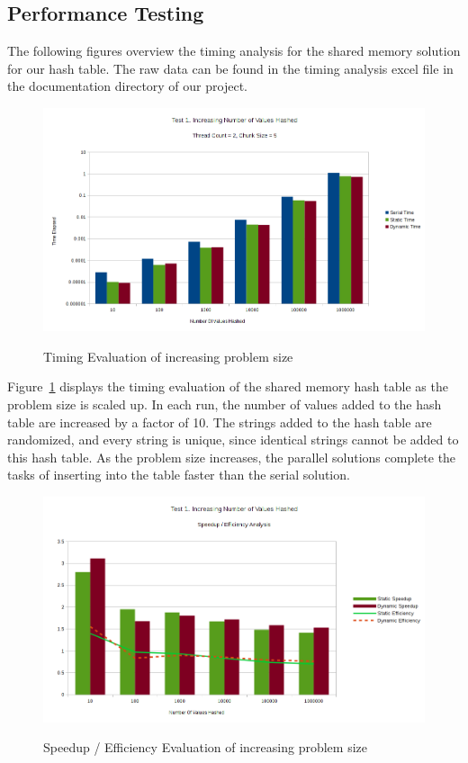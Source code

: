 \documentclass{article}
\begin{document}
\subsection{Performance Testing}
The following figures overview the timing analysis for the shared memory solution for our hash table.
The raw data can be found in the timing analysis excel file in the documentation directory of
our project.
\begin{figure}[H]
  \caption{Timing Evaluation of increasing problem size}
  \centering
  \includegraphics[width=\textwidth]{chart1a}
  \label{fig:chart1a}
\end{figure}

Figure~\ref{fig:chart1a} displays the timing evaluation of the shared memory hash table as the problem 
size is scaled up. In each run, the number of values added to the hash table are increased by a factor 
of 10. The strings added to the hash table are randomized, and every string is unique, since identical 
strings cannot be added to this hash table. As the problem size increases, the parallel solutions complete 
the tasks of inserting into the table faster than the serial solution.

\begin{figure}[H]
  \caption{Speedup / Efficiency Evaluation of increasing problem size}
  \centering
  \includegraphics[width=\textwidth]{chart1b}
  \label{fig:chart1b}
\end{figure}
\end{document}
